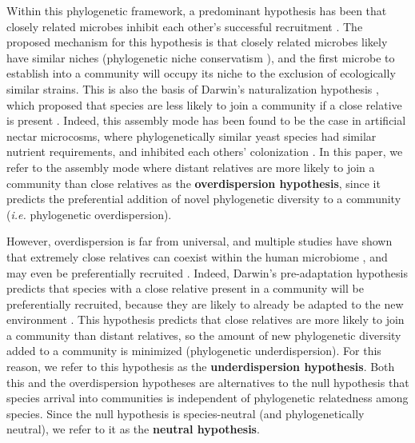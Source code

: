 \documentclass{article}
\begin{document}
\par
Within this phylogenetic framework, a predominant hypothesis has been that closely related microbes inhibit each other’s successful recruitment \cite{Nemergut2013,Fukami2015,Verster2018}. The proposed mechanism for this hypothesis is that closely related microbes likely have similar niches (phylogenetic niche conservatism \cite{Losos2008}), and the first microbe to establish into a community will occupy its niche to the exclusion of ecologically similar strains. This is also the basis of Darwin’s naturalization hypothesis \cite{Darwin1859}, which proposed that species are less likely to join a community if a close relative is present \cite{Ma2016}. Indeed, this assembly mode has been found to be the case in artificial nectar microcosms, where phylogenetically similar yeast species had similar nutrient requirements, and inhibited each others’ colonization \cite{Peay2012}. In this paper, we refer to the assembly mode where distant relatives are more likely to join a community than close relatives as the \textbf{overdispersion hypothesis}, since it predicts the preferential addition of novel phylogenetic diversity to a community (\emph{i.e.} phylogenetic overdispersion).
\par
However, overdispersion is far from universal, and multiple studies have shown that extremely close relatives can coexist within the human microbiome \cite{Li2016,Tett2019}, and may even be preferentially recruited \cite{Brown2018}. Indeed, Darwin’s pre-adaptation hypothesis predicts that species with a close relative present in a community will be preferentially recruited, because they are likely to already be adapted to the new environment \cite{Darwin1859}. This hypothesis predicts that close relatives are more likely to join a community than distant relatives, so the amount of new phylogenetic diversity added to a community is minimized (phylogenetic underdispersion). For this reason, we refer to this hypothesis as the \textbf{underdispersion hypothesis}. Both this and the overdispersion hypotheses are alternatives to the null hypothesis that species arrival into communities is independent of phylogenetic relatedness among species. Since the null hypothesis is species-neutral (and phylogenetically neutral), we refer to it as the \textbf{neutral hypothesis}.
\par
\end{document}
